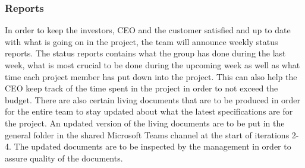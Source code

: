 \subsubsection{Reports}
In order to keep the investors, CEO and the customer satisfied and up to date with what is going on in the project, the team will announce weekly status reports. The status reports contains what the group has done during the last week, what is most crucial to be done during the upcoming week as well as what time each project member has put down into the project. This can also help the CEO keep track of the time spent in the project in order to not exceed the budget. There are also certain living documents that are to be produced in order for the entire team to stay updated about what the latest specifications are for the project. An updated version of the living documents are to be put in the general folder in the shared Microsoft Teams channel at the start of iterations 2-4. The updated documents are to be inspected by the management in order to assure quality of the documents. 
